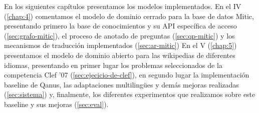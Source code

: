 En los siguientes capítulos presentamos los modelos implementados. En el IV (\ref{chap:4}) comentamos el modelo de dominio cerrado para la base de datos  Mitic, presentando primero la base de conocimientos y su API específica de acceso (\ref{sec:grafo-mitic}), el proceso de anotado de preguntas (\ref{sec:qp-mitic}) y los mecanismos de traducción implementados (\ref{sec:ar-mitic})
En el V (\ref{chap:5}) presentamos el modelo de dominio abierto para las wikipedias de diferentes idiomas, presentando en primer lugar los problemas seleccionados de la competencia Clef '07 (\ref{sec:ejecicio-de-clef}), en segundo lugar la implementación baseline de Qanus, las adaptaciones multilingües y demás mejoras realizadas (\ref{sec:sistema}) y, finalmente, los diferentes experimentos que realizamos sobre este baseline y sus mejoras (\ref{sec:eval}).

\faltadependiente

